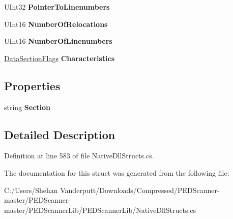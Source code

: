 \begin{DoxyCompactItemize}
U\+Int32 {\bfseries Pointer\+To\+Linenumbers}
\item 
\mbox{\label{struct_p_e_d_scanner_lib_1_1_struct_1_1_pe_header_reader_1_1_i_m_a_g_e___s_e_c_t_i_o_n___h_e_a_d_e_r_ab08bfb8d969fee888b18196d89852c43}} 
U\+Int16 {\bfseries Number\+Of\+Relocations}
\item 
\mbox{\label{struct_p_e_d_scanner_lib_1_1_struct_1_1_pe_header_reader_1_1_i_m_a_g_e___s_e_c_t_i_o_n___h_e_a_d_e_r_adfe5907708ddbb74c2ea9e13b275b2ce}} 
U\+Int16 {\bfseries Number\+Of\+Linenumbers}
\item 
\mbox{\label{struct_p_e_d_scanner_lib_1_1_struct_1_1_pe_header_reader_1_1_i_m_a_g_e___s_e_c_t_i_o_n___h_e_a_d_e_r_a388f225dacce7ecabacadd28b172901d}} 
\mbox{\hyperlink{class_p_e_d_scanner_lib_1_1_struct_1_1_pe_header_reader_aaa653fc9f63948e6fcdc31bc79e5aeff}{Data\+Section\+Flags}} {\bfseries Characteristics}
\end{DoxyCompactItemize}
\subsection*{Properties}
\begin{DoxyCompactItemize}
\item 
\mbox{\label{struct_p_e_d_scanner_lib_1_1_struct_1_1_pe_header_reader_1_1_i_m_a_g_e___s_e_c_t_i_o_n___h_e_a_d_e_r_a38c23a521432afea0ca981b7a0ec5136}} 
string {\bfseries Section}
\end{DoxyCompactItemize}


\subsection{Detailed Description}


Definition at line 583 of file Native\+Dll\+Structs.\+cs.



The documentation for this struct was generated from the following file\+:\begin{DoxyCompactItemize}
\item 
C\+:/\+Users/\+Shehan Vanderputt/\+Downloads/\+Compressed/\+P\+E\+D\+Scanner-\/master/\+P\+E\+D\+Scanner-\/master/\+P\+E\+D\+Scanner\+Lib/\+P\+E\+D\+Scanner\+Lib/Native\+Dll\+Structs.\+cs\end{DoxyCompactItemize}
